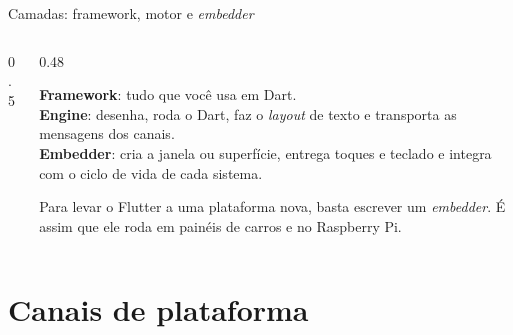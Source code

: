 \documentclass[aspectratio=169,10pt]{beamer}
\begin{document}
\begin{frame}{Camadas: framework, motor e \emph{embedder}}
  \begin{columns}[c]
    \begin{column}{0.5\textwidth}
      \centering
    \end{column}
    \begin{column}{0.48\textwidth}
      \begin{conceito}
        \textbf{Framework}: tudo que você usa em Dart.\\
        \textbf{Engine}: desenha, roda o Dart, faz o \emph{layout} de texto e transporta as mensagens dos canais.\\
        \textbf{Embedder}: cria a janela ou superfície, entrega toques e teclado e integra com o ciclo de vida de cada sistema.
      \end{conceito}
      \begin{pordentro}[Portabilidade]
        Para levar o Flutter a uma plataforma nova, basta escrever um \emph{embedder}. É assim que ele roda em painéis de carros e no Raspberry Pi.
      \end{pordentro}
    \end{column}
  \end{columns}
\end{frame}

\section{Canais de plataforma}
\end{document}
